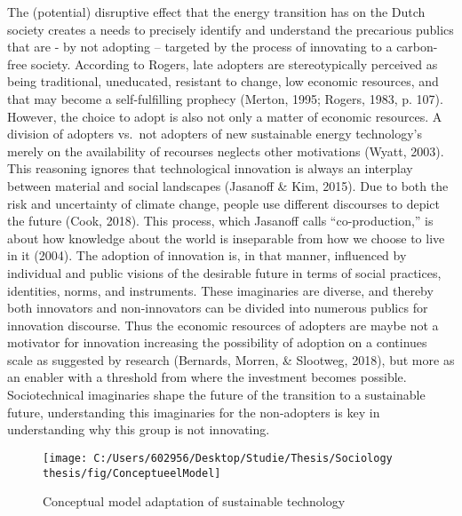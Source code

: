 \documentclass[man,floatsintext]{apa6}
\begin{document}
The (potential) disruptive effect that the energy transition has on the
Dutch society creates a needs to precisely identify and understand the
precarious publics that are - by not adopting -- targeted by the process
of innovating to a carbon-free society. According to Rogers, late
adopters are stereotypically perceived as being traditional, uneducated,
resistant to change, low economic resources, and that may become a
self-fulfilling prophecy (Merton, 1995; Rogers, 1983, p. 107). However,
the choice to adopt is also not only a matter of economic resources. A
division of adopters vs.~not adopters of new sustainable energy
technology's merely on the availability of recourses neglects other
motivations (Wyatt, 2003). This reasoning ignores that technological
innovation is always an interplay between material and social landscapes
(Jasanoff \& Kim, 2015). Due to both the risk and uncertainty of climate
change, people use different discourses to depict the future (Cook,
2018). This process, which Jasanoff calls \enquote{co-production,} is
about how knowledge about the world is inseparable from how we choose to
live in it (2004). The adoption of innovation is, in that manner,
influenced by individual and public visions of the desirable future in
terms of social practices, identities, norms, and instruments. These
imaginaries are diverse, and thereby both innovators and non-innovators
can be divided into numerous publics for innovation discourse. Thus the
economic resources of adopters are maybe not a motivator for innovation
increasing the possibility of adoption on a continues scale as suggested
by research (Bernards, Morren, \& Slootweg, 2018), but more as an
enabler with a threshold from where the investment becomes possible.
Sociotechnical imaginaries shape the future of the transition to a
sustainable future, understanding this imaginaries for the non-adopters
is key in understanding why this group is not innovating.

\begin{figure}

{\centering \texttt{[image: C:/Users/602956/Desktop/Studie/Thesis/Sociology thesis/fig/ConceptueelModel]} 

}

\caption{Conceptual model adaptation of sustainable technology}\label{fig:Conspt}
\end{figure}
\end{document}
